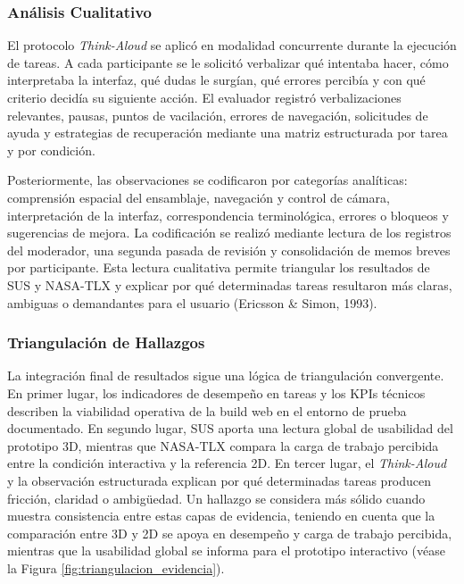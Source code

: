\subsubsection{Análisis Cualitativo}

El protocolo \textit{Think-Aloud} se aplicó en modalidad concurrente durante la ejecución de tareas. A cada participante se le solicitó verbalizar qué intentaba hacer, cómo interpretaba la interfaz, qué dudas le surgían, qué errores percibía y con qué criterio decidía su siguiente acción. El evaluador registró verbalizaciones relevantes, pausas, puntos de vacilación, errores de navegación, solicitudes de ayuda y estrategias de recuperación mediante una matriz estructurada por tarea y por condición.

Posteriormente, las observaciones se codificaron por categorías analíticas: comprensión espacial del ensamblaje, navegación y control de cámara, interpretación de la interfaz, correspondencia terminológica, errores o bloqueos y sugerencias de mejora. La codificación se realizó mediante lectura de los registros del moderador, una segunda pasada de revisión y consolidación de memos breves por participante. Esta lectura cualitativa permite triangular los resultados de SUS y NASA-TLX y explicar por qué determinadas tareas resultaron más claras, ambiguas o demandantes para el usuario (Ericsson \& Simon, 1993).

\subsubsection{Triangulación de Hallazgos}

La integración final de resultados sigue una lógica de triangulación convergente. En primer lugar, los indicadores de desempeño en tareas y los KPIs técnicos describen la viabilidad operativa de la build web en el entorno de prueba documentado. En segundo lugar, SUS aporta una lectura global de usabilidad del prototipo 3D, mientras que NASA-TLX compara la carga de trabajo percibida entre la condición interactiva y la referencia 2D. En tercer lugar, el \textit{Think-Aloud} y la observación estructurada explican por qué determinadas tareas producen fricción, claridad o ambigüedad. Un hallazgo se considera más sólido cuando muestra consistencia entre estas capas de evidencia, teniendo en cuenta que la comparación entre 3D y 2D se apoya en desempeño y carga de trabajo percibida, mientras que la usabilidad global se informa para el prototipo interactivo (véase la Figura \ref{fig:triangulacion_evidencia}).

